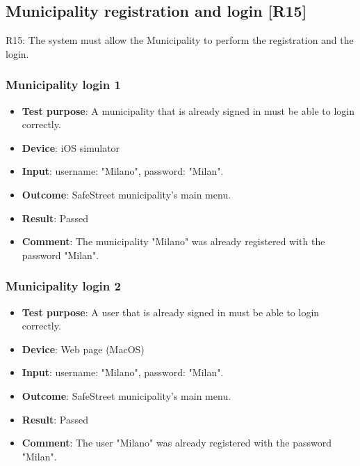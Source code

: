 \documentclass[../ATD.tex]{subfiles}
\begin{document}
    \subsection{Municipality registration and login [R15]}\label{subsec:municipality-registration-and-login}
    R15: The system must allow the Municipality to perform the registration and the login.

    \subsubsection{Municipality login 1}\label{subsubsec:municipality-login-1}
    \begin{itemize}
        \item \textbf{Test purpose}: A municipality that is already signed in must be able to login correctly.
        \item \textbf{Device}: iOS simulator
        \item \textbf{Input}: username: "Milano", password: "Milan".
        \item \textbf{Outcome}: SafeStreet municipality's main menu.
        \item \textbf{Result}: Passed
        \item \textbf{Comment}: The municipality "Milano" was already registered with the password "Milan".
    \end{itemize}

    \subsubsection{Municipality login 2}\label{subsubsec:municipality-login-2}
    \begin{itemize}
        \item \textbf{Test purpose}: A user that is already signed in must be able to login correctly.
        \item \textbf{Device}: Web page (MacOS)
        \item \textbf{Input}: username: "Milano", password: "Milan".
        \item \textbf{Outcome}: SafeStreet municipality's main menu.
        \item \textbf{Result}: Passed
        \item \textbf{Comment}: The user "Milano" was already registered with the password "Milan".
    \end{itemize}
\end{document}
